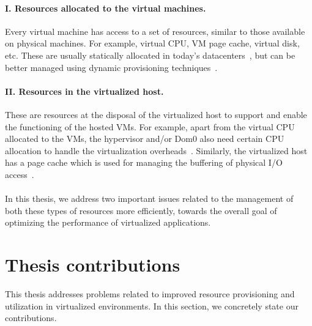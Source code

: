 \paragraph{I. Resources allocated to the virtual machines.}
Every virtual machine has access to a set of resources, similar
to those available on physical machines.
For example, virtual CPU, VM page cache, virtual disk, etc.
These are
usually statically allocated in today's datacenters~\cite{ec2},
but can be better managed using dynamic provisioning
techniques~\cite{sandpiper, google-live-migration}.

\paragraph{II. Resources in the virtualized host.} These are resources
at the disposal of the virtualized host to support and enable
the functioning of the hosted VMs. For example, apart from 
the virtual CPU allocated to the VMs, the hypervisor 
and/or Dom0 
also need certain CPU allocation to handle the virtualization
overheads~\cite{measuring-cpu-overhead}. 
Similarly, the virtualized host has a 
page cache which is used for managing the buffering of 
physical I/O access~\cite{my-cache-or-yours}. 
\\
\\
In this thesis, we address two
important issues related to the management of both
these types of resources more efficiently, towards the overall goal
of optimizing the performance of virtualized applications.

\section{Thesis contributions}
This thesis addresses problems related to improved resource provisioning
and utilization in virtualized environments. In this section, we concretely
state our contributions.

